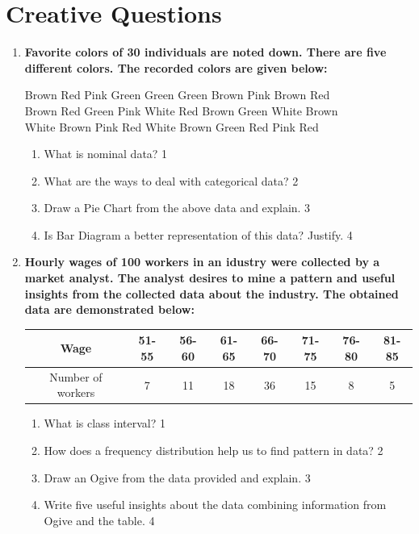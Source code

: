 \documentclass[a4paper,oneside]{book}
\begin{document}
\section{Creative Questions}

    \begin{enumerate}
    
     \item
	  \textbf{Favorite colors of 30 individuals are noted down. There are five different colors. The recorded colors are given below:}
	  
	  \begin{centering}
	  Brown Red   Pink  Green Green Green Brown Pink  Brown Red   \\
    Brown Red   Green Pink  White Red   Brown Green White Brown \\
    White Brown Pink  Red   White Brown Green Red   Pink  Red  \\
    \end{centering}
    
  
  \begin{enumerate}
    \item
	What is nominal data? \hfill 1
    \item
	What are the ways to deal with categorical data? \hfill 2
    \item  
	Draw a Pie Chart from the above data and explain. \hfill 3
    \item
	Is Bar Diagram a better representation of this data? Justify. \hfill 4
  \end{enumerate}
  
     \item
	  \textbf{Hourly wages of 100 workers in an idustry were collected by a market analyst. The analyst desires to mine a pattern and useful insights from the collected data about the industry. The obtained data are demonstrated below:}
	  
	  \begin{table}[h]
	  \centering
\begin{tabular}{c|c|c|c|c|c|c|c}
Wage              & 51-55 & 56-60 & 61-65 & 66-70 & 71-75 & 76-80 & 81-85 \\ \hline
Number of workers & 7     & 11    & 18    & 36    & 15    & 8     & 5    
\end{tabular}
\end{table}

  \begin{enumerate}
    \item
	What is class interval? \hfill 1
    \item
	How does a frequency distribution help us to find pattern in data? \hfill 2
    \item  
	Draw an Ogive from the data provided and explain. \hfill 3
    \item
	Write five useful insights about the data combining information from Ogive and the table. \hfill 4
  \end{enumerate}
  
    \end{enumerate}
    
\end{document}

